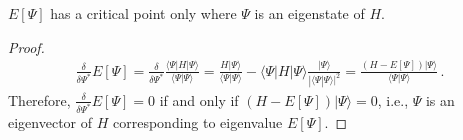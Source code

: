 \begin{theorem}
\label{theorem:criticalpoint}
$E[\Psi]$ has a critical point only where $\Psi$ is an eigenstate of $H$.
\end{theorem}
\begin{proof}
\begin{eqnarray}
\frac{\delta }{\delta \Psi^*}  E[\Psi] = \frac{\delta}{\delta \Psi^*}\frac{\langle \Psi |H|\Psi\rangle}{\langle \Psi |\Psi\rangle} = \frac{H|\Psi\rangle}{\langle \Psi |\Psi\rangle} - \langle \Psi |H|\Psi\rangle \frac{|\Psi \rangle}{|\langle \Psi | \Psi\rangle|^2} =\frac{ (H-E[\Psi])|\Psi\rangle }{\langle\Psi|\Psi\rangle}\,.
\end{eqnarray}
Therefore, 
$\frac{\delta }{\delta \Psi^*}  E[\Psi] = 0$ if and only if $(H-E[\Psi])|\Psi\rangle =0$, i.e., $\Psi$ is an eigenvector of $H$ corresponding to eigenvalue $E[\Psi]$.  




\end{proof}



